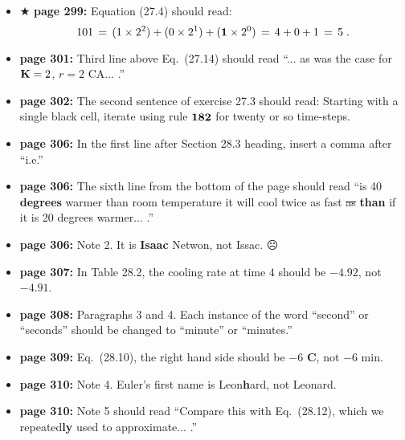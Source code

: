 \documentclass[12pt]{article}
\begin{document}
\begin{itemize}
  \item $\bigstar$ {\bf page 299:} Equation (27.4) should read:
\begin{equation}
  101 \, = \, (1 \times 2^2) + (0 \times 2^1) + ({\bf 1} \times 2^0)
  \, = \, 4 + 0 + 1 \, = \, 5 \;.
\end{equation}

  \item {\bf page 301:} Third line above Eq.~(27.14) should read
    ``... as was the case for ${\bf K}=2$, {\bf $r=2$} CA... .''

  \item {\bf page 302:}  The second sentence of exercise 27.3 should
    read: Starting with a single black cell, iterate using rule {\bf
      ${\bf 182}$} for twenty or so time-steps.

  \item {\bf page 306:}  In the first line after Section 28.3 heading,
    insert a comma after ``i.e.''

  \item {\bf page 306:}  The sixth line from the bottom of the page
    should read ``is 40 {\bf degrees} warmer than room temperature it
    will cool twice as fast \sout{as} {\bf than} if it is 20 degrees
    warmer... .''

  \item {\bf page 306:}  Note 2.  It is {\bf Isaac} Netwon, not
    Issac.  $\frownie$


  \item {\bf page 307:}  In Table 28.2, the cooling rate at time $4$
    should be $-4.92$, not $-4.91$.  

  \item {\bf page 308:}  Paragraphs 3 and 4.  Each instance of the
    word ``second'' or ``seconds'' should be changed to ``minute'' or
    ``minutes.'' 

  \item {\bf page 309:}  Eq.~(28.10), the right hand side should be
    $-6$ {\bf C}, not $-6$ min.

  \item {\bf page 310:} Note 4.  Euler's first name is Leon{\bf h}ard,
    not Leonard.

  \item {\bf page 310:}  Note 5 should read ``Compare this with
    Eq.~(28.12), which we repeated{\bf ly} used to approximate... .'' 


\end{itemize}
\end{document}
